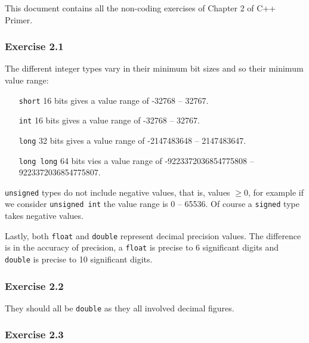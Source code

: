 \documentclass[12pt, a4paper]{article}
\begin{document}
This document contains all the non-coding exercises of Chapter 2 of C++ Primer.
\subsubsection*{Exercise 2.1}

The different integer types vary in their minimum bit sizes and so their minimum value range:
\begin{itemize}
	\item [\texttt{short}]
		16 bits gives a value range of -32768 -- 32767.
	\item [\texttt{int}]
		16 bits gives a value range of -32768 -- 32767.
	\item [\texttt{long}]
		32 bits gives a value range of -2147483648 -- 2147483647.
	\item [\texttt{long long}]
		64 bits vies a value range of -9223372036854775808 -- 9223372036854775807.
\end{itemize}

\texttt{unsigned} types do not include negative values, that is, values $\geq 0$, for example if we consider \texttt{unsigned int} the value range is 0 -- 65536. Of course a \texttt{signed} type takes negative values.

Lastly, both \texttt{float} and \texttt{double} represent decimal precision values. The difference is in the accuracy of precision, a \texttt{float} is precise to 6 significant digits and \texttt{double} is precise to 10 significant digits.

\subsubsection*{Exercise 2.2}
They should all be \texttt{double} as they all involved decimal figures.

\subsubsection*{Exercise 2.3}
\end{document}
